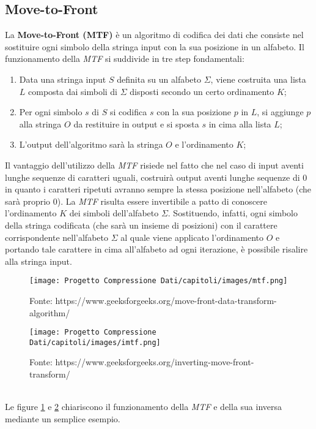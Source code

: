 \begin{enumerate}
\subsection{Move-to-Front} \label{section:mtf}
La \textbf{Move-to-Front (MTF)} è un algoritmo di codifica dei dati che consiste nel sostituire ogni simbolo della stringa input con la sua posizione in un alfabeto. Il funzionamento della \emph{MTF} si suddivide in tre step fondamentali:
\begin{enumerate}
    \item Data una stringa input $S$ definita su un alfabeto $\Sigma$, viene costruita una lista $L$ composta dai simboli di $\Sigma$ disposti secondo un certo ordinamento $K$;
    \item Per ogni simbolo $s$ di $S$ si codifica $s$ con la sua posizione $p$ in $L$, si aggiunge $p$ alla stringa $O$ da restituire in output e si sposta $s$ in cima alla lista $L$;
    \item L'output dell'algoritmo sarà la stringa $O$ e l'ordinamento $K$;
\end{enumerate}
Il vantaggio dell'utilizzo della \emph{MTF} risiede nel fatto che nel caso di input aventi lunghe sequenze di caratteri uguali, costruirà output aventi lunghe sequenze di $0$ in quanto i caratteri ripetuti avranno sempre la stessa posizione nell'alfabeto (che sarà proprio 0). La \emph{MTF} risulta essere invertibile a patto di conoscere l'ordinamento $K$ dei simboli dell'alfabeto $\Sigma$. Sostituendo, infatti, ogni simbolo della stringa codificata (che sarà un insieme di posizioni) con il carattere corrispondente nell'alfabeto $\Sigma$ al quale viene applicato l'ordinamento $O$ e portando tale carattere in cima all'alfabeto ad ogni iterazione, è possibile risalire alla stringa input. 
\begin{figure}[h]
    \centering
    \texttt{[image: Progetto Compressione Dati/capitoli/images/mtf.png]}
\caption{Fonte: https://www.geeksforgeeks.org/move-front-data-transform-algorithm/}
    \label{fig:mtf}
\end{figure}
\begin{figure}[h]
    \centering
    \texttt{[image: Progetto Compressione Dati/capitoli/images/imtf.png]}
\caption{Fonte: https://www.geeksforgeeks.org/inverting-move-front-transform/}
    \label{fig:imtf}
\end{figure} \\
Le figure \ref{fig:mtf} e \ref{fig:imtf} chiariscono il funzionamento della \emph{MTF} e della sua inversa mediante un semplice esempio. 


\end{enumerate}
